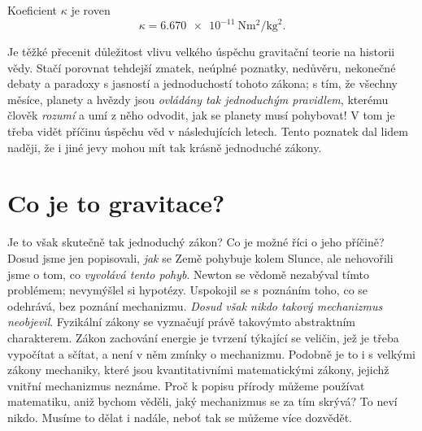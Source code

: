 {    Koeficient \(\kappa\) je roven 
    \begin{equation}\label{FYZ:eq095}
      \kappa = \SI{6.670e-11}{\N\square\meter\per\square\kg}.
    \end{equation}
    
    Je těžké přecenit důležitost vlivu velkého úspěchu gravitační teorie na historii vědy. Stačí 
    porovnat tehdejší zmatek, neúplné poznatky, nedůvěru, nekonečné debaty a paradoxy s jasností a 
    jednoduchostí tohoto zákona; s tím, že všechny měsíce, planety a hvězdy jsou \emph{ovládány tak 
    jednoduchým pravidlem}, kterému člověk \emph{rozumí} a umí z něho odvodit, jak se planety musí 
    pohybovat! V tom je třeba vidět příčinu úspěchu věd v následujících letech. Tento poznatek dal 
    lidem naději, že i jiné jevy mohou mít tak krásně jednoduché zákony.
    
  \section{Co je to gravitace?}
    Je to však skutečně tak jednoduchý zákon? Co je možné říci o jeho příčině? Dosud jsme jen 
    popisovali, \emph{jak} se Země pohybuje kolem Slunce, ale nehovořili jsme o tom, co 
    \emph{vyvolává tento pohyb}. Newton se vědomě nezabýval tímto problémem; nevymýšlel si 
    hypotézy. Uspokojil se s poznáním toho, co se odehrává, bez poznání mechanizmu. \emph{Dosud 
    však nikdo takový mechanizmus neobjevil}. Fyzikální zákony se vyznačují právě takovýmto 
    abstraktním charakterem. Zákon zachování energie je tvrzení týkající se veličin, jež je třeba 
    vypočítat a sčítat, a není v něm zmínky o mechanizmu. Podobně je to i s velkými zákony 
    mechaniky, které jsou kvantitativními matematickými zákony, jejichž vnitřní mechanizmus 
    neznáme. Proč k popisu přírody můžeme používat matematiku, aniž bychom věděli, jaký mechanizmus 
    se za tím skrývá? To neví nikdo. Musíme to dělat i nadále, neboť tak se můžeme více dozvědět.
    
}
